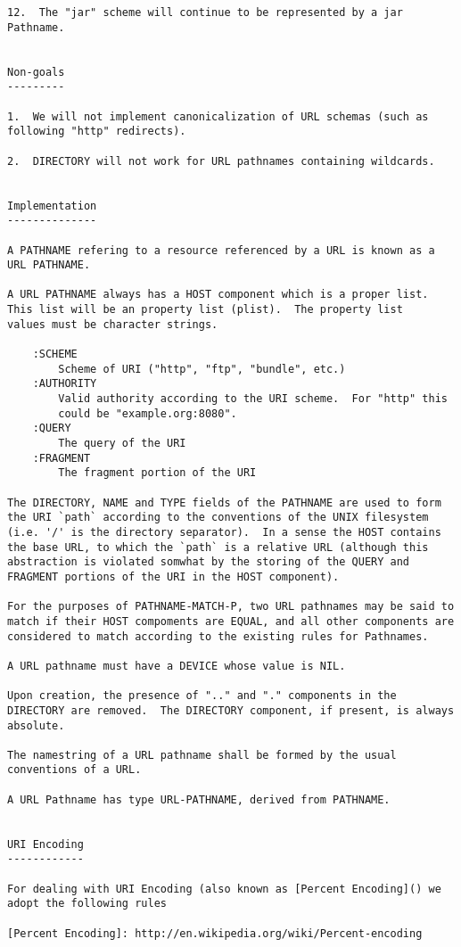\begin{verbatim}
12.  The "jar" scheme will continue to be represented by a jar
Pathname.


Non-goals 
---------

1.  We will not implement canonicalization of URL schemas (such as
following "http" redirects).

2.  DIRECTORY will not work for URL pathnames containing wildcards.


Implementation
--------------

A PATHNAME refering to a resource referenced by a URL is known as a
URL PATHNAME.

A URL PATHNAME always has a HOST component which is a proper list.
This list will be an property list (plist).  The property list
values must be character strings.

    :SCHEME
        Scheme of URI ("http", "ftp", "bundle", etc.)
    :AUTHORITY   
        Valid authority according to the URI scheme.  For "http" this
        could be "example.org:8080".
    :QUERY
        The query of the URI
    :FRAGMENT
        The fragment portion of the URI
        
The DIRECTORY, NAME and TYPE fields of the PATHNAME are used to form
the URI `path` according to the conventions of the UNIX filesystem
(i.e. '/' is the directory separator).  In a sense the HOST contains
the base URL, to which the `path` is a relative URL (although this
abstraction is violated somwhat by the storing of the QUERY and
FRAGMENT portions of the URI in the HOST component).

For the purposes of PATHNAME-MATCH-P, two URL pathnames may be said to
match if their HOST compoments are EQUAL, and all other components are
considered to match according to the existing rules for Pathnames.

A URL pathname must have a DEVICE whose value is NIL.

Upon creation, the presence of ".." and "." components in the
DIRECTORY are removed.  The DIRECTORY component, if present, is always
absolute.

The namestring of a URL pathname shall be formed by the usual
conventions of a URL.

A URL Pathname has type URL-PATHNAME, derived from PATHNAME.


URI Encoding 
------------

For dealing with URI Encoding (also known as [Percent Encoding]() we
adopt the following rules

[Percent Encoding]: http://en.wikipedia.org/wiki/Percent-encoding


\end{verbatim}

